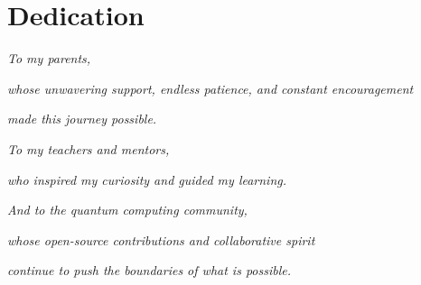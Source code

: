 
\chapter*{Dedication}

\vspace{3cm}

\begin{center}
\textit{To my parents,}

\vspace{0.5cm}

\textit{whose unwavering support, endless patience, and constant encouragement}

\textit{made this journey possible.}

\vspace{1cm}

\textit{To my teachers and mentors,}

\textit{who inspired my curiosity and guided my learning.}

\vspace{1cm}

\textit{And to the quantum computing community,}

\textit{whose open-source contributions and collaborative spirit}

\textit{continue to push the boundaries of what is possible.}
\end{center}

\vspace{3cm}
